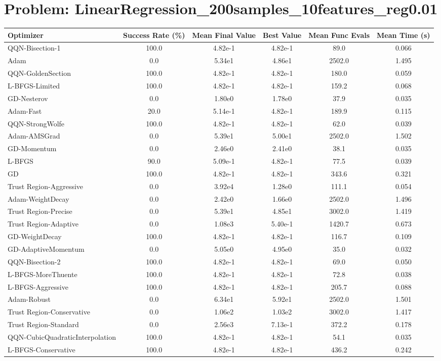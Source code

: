 \documentclass{article}
\begin{document}
\section{Problem: LinearRegression\_200samples\_10features\_reg0.01}
\begin{longtable}{p{3cm}*{5}{c}}
\toprule
\textbf{Optimizer} & \textbf{Success Rate (\%)} & \textbf{Mean Final Value} & \textbf{Best Value} & \textbf{Mean Func Evals} & \textbf{Mean Time (s)} \\
\midrule
QQN-Bisection-1 & 100.0 & 4.82e-1 & 4.82e-1 & 89.0 & 0.066 \\
Adam & 0.0 & 5.34e1 & 4.86e1 & 2502.0 & 1.495 \\
QQN-GoldenSection & 100.0 & 4.82e-1 & 4.82e-1 & 180.0 & 0.059 \\
L-BFGS-Limited & 100.0 & 4.82e-1 & 4.82e-1 & 159.2 & 0.068 \\
GD-Nesterov & 0.0 & 1.80e0 & 1.78e0 & 37.9 & 0.035 \\
Adam-Fast & 20.0 & 5.14e-1 & 4.82e-1 & 189.9 & 0.115 \\
QQN-StrongWolfe & 100.0 & 4.82e-1 & 4.82e-1 & 62.0 & 0.039 \\
Adam-AMSGrad & 0.0 & 5.39e1 & 5.00e1 & 2502.0 & 1.502 \\
GD-Momentum & 0.0 & 2.46e0 & 2.41e0 & 38.1 & 0.035 \\
L-BFGS & 90.0 & 5.09e-1 & 4.82e-1 & 77.5 & 0.039 \\
GD & 100.0 & 4.82e-1 & 4.82e-1 & 343.6 & 0.321 \\
Trust Region-Aggressive & 0.0 & 3.92e4 & 1.28e0 & 111.1 & 0.054 \\
Adam-WeightDecay & 0.0 & 2.42e0 & 1.66e0 & 2502.0 & 1.496 \\
Trust Region-Precise & 0.0 & 5.39e1 & 4.85e1 & 3002.0 & 1.419 \\
Trust Region-Adaptive & 0.0 & 1.08e3 & 5.40e-1 & 1420.7 & 0.673 \\
GD-WeightDecay & 100.0 & 4.82e-1 & 4.82e-1 & 116.7 & 0.109 \\
GD-AdaptiveMomentum & 0.0 & 5.05e0 & 4.95e0 & 35.0 & 0.032 \\
QQN-Bisection-2 & 100.0 & 4.82e-1 & 4.82e-1 & 69.0 & 0.050 \\
L-BFGS-MoreThuente & 100.0 & 4.82e-1 & 4.82e-1 & 72.8 & 0.038 \\
L-BFGS-Aggressive & 100.0 & 4.82e-1 & 4.82e-1 & 205.7 & 0.088 \\
Adam-Robust & 0.0 & 6.34e1 & 5.92e1 & 2502.0 & 1.501 \\
Trust Region-Conservative & 0.0 & 1.06e2 & 1.03e2 & 3002.0 & 1.417 \\
Trust Region-Standard & 0.0 & 2.56e3 & 7.13e-1 & 372.2 & 0.178 \\
QQN-CubicQuadraticInterpolation & 100.0 & 4.82e-1 & 4.82e-1 & 54.1 & 0.035 \\
L-BFGS-Conservative & 100.0 & 4.82e-1 & 4.82e-1 & 436.2 & 0.242 \\
\bottomrule
\end{longtable}
\end{document}
